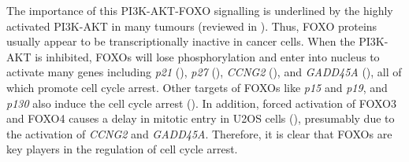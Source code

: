 The importance of this PI3K-AKT-FOXO signalling is underlined by the highly activated PI3K-AKT in many tumours (reviewed in \cite{myatt2007the}). Thus, FOXO proteins usually appear to be transcriptionally inactive in cancer cells. When the PI3K-AKT is inhibited, FOXOs will lose phosphorylation and enter into nucleus to activate many genes including \textit{p21} (\cite{seoane2004integration}), \textit{p27} (\cite{medema2000afx-like}), \textit{CCNG2} (\cite{martínez-gac2004control}), and \textit{GADD45A} (\cite{tran2002dna}), all of which promote cell cycle arrest. Other targets of FOXOs like \textit{p15} and \textit{p19}, and \textit{p130} also induce the cell cycle arrest (\cite{katayama2008foxo,kops2002control}). In addition, forced activation of FOXO3 and FOXO4 causes a delay in mitotic entry in U2OS cells (\cite{laoukili2005foxm1}), presumably due to the activation of \textit{CCNG2} and \textit{GADD45A}. Therefore, it is clear that FOXOs are key players in the regulation of cell cycle arrest.

